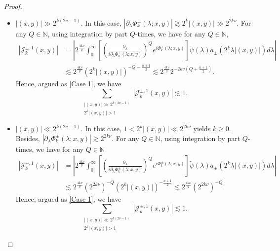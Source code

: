 \documentclass[10pt,a4paper]{amsart}
\begin{document}
\begin{proof}
\begin{itemize}
\begin{equation}
\end{equation}
\item $|(x,y)|\gg 2^{k(2\nu-1)}$. In this case, $|\partial_\lambda\Phi^\pm_k(\lambda;x,y)|\gtrsim 2^k|(x,y)|\gg 2^{2k\nu}$. For any $Q\in\mathbb{N}$, using integration by part $Q$-times, we have for any $Q\in\mathbb{N}$,
\begin{equation}
\begin{aligned}
|\mathcal{J}_k^{\pm,1}(x,y)|&=\left|2^\frac{4k\nu}{q}\int_0^\infty  \left[\left(\frac{\partial_\lambda}{i\partial_\lambda\Phi^\pm_k(\lambda;x,y)}\right)^Q e^{i\Phi^\pm_k(\lambda;x,y)}\right] \widetilde{\psi}(\lambda)a_{\pm}(2^k\lambda|(x,y)|)d\lambda\right|\\
&\lesssim 2^\frac{4k\nu}{q}\left(2^k|(x,y)|\right)^{-Q-\frac{n+1}{2}}\lesssim 2^\frac{4k\nu}{q}2^{-2k\nu(Q+\frac{n+1}{2})}.
\end{aligned}
\end{equation}
Hence, argued as \eqref{Case 1}, we have
\begin{equation}\label{Subcase 2}
\sum_{\substack{|(x,y)|\gg 2^{k(2\nu-1)}\\ 2^k|(x,y)|>1}}|\mathcal{J}_k^{\pm,1}(x,y)|\lesssim 1.
\end{equation}
\item $|(x,y)|\ll 2^{k(2\nu-1)}$. In this case, $1<2^k|(x,y)|\ll 2^{2k\nu}$ yields $k\geq 0$. Besides, $|\partial_\lambda\Phi^\pm_k(\lambda;x,y)|\gtrsim 2^{2k\nu}$. For any $Q\in\mathbb{N}$, using integration by part $Q$-times, we have for any $Q\in\mathbb{N}$
\begin{equation}
\begin{aligned}
|\mathcal{J}_k^{\pm,1}(x,y)|&=\left|2^\frac{4k\nu}{q}\int_0^\infty  \left[\left(\frac{\partial_\lambda}{i\partial_\lambda\Phi^\pm_k(\lambda;x,y)}\right)^Q e^{i\Phi^\pm_k(\lambda;x,y)}\right] \widetilde{\psi}(\lambda)a_{\pm}(2^k\lambda|(x,y)|)d\lambda\right|\\
&\lesssim 2^\frac{4k\nu}{q}\left(2^{2k\nu}\right)^{-Q}\left(2^k|(x,y)|\right)^{-\frac{n+1}{2}}\lesssim 2^\frac{4k\nu}{q}\left(2^{2k\nu}\right)^{-Q}.
\end{aligned}
\end{equation}
Hence, argued as \eqref{Case 1}, we have
\begin{equation}\label{Subcase 3}
\sum_{\substack{|(x,y)|\ll 2^{k(2\nu-1)}\\ 2^k|(x,y)|>1}}|\mathcal{J}_k^{\pm,1}(x,y)|\lesssim 1.
\end{equation}
\end{itemize}

\end{proof}
\end{document}
